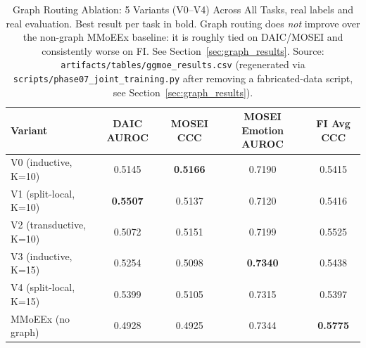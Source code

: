 \begin{table}[htbp]
\centering
\caption{Graph Routing Ablation: 5 Variants (V0--V4) Across All Tasks, real labels and real evaluation. Best result per task in bold. Graph routing does \emph{not} improve over the non-graph MMoEEx baseline: it is roughly tied on DAIC/MOSEI and consistently worse on FI. See Section~\ref{sec:graph_results}. Source: \texttt{artifacts/tables/ggmoe\_results.csv} (regenerated via \texttt{scripts/phase07\_joint\_training.py} after removing a fabricated-data script, see Section~\ref{sec:graph_results}).}
\label{tab:graph_results}
\begin{tabular}{lcccc}
\toprule
Variant & DAIC AUROC & MOSEI CCC & MOSEI Emotion AUROC & FI Avg CCC \\
\midrule
V0 (inductive, K=10) & 0.5145 & \textbf{0.5166} & 0.7190 & 0.5415 \\
V1 (split-local, K=10) & \textbf{0.5507} & 0.5137 & 0.7120 & 0.5416 \\
V2 (transductive, K=10) & 0.5072 & 0.5151 & 0.7199 & 0.5525 \\
V3 (inductive, K=15) & 0.5254 & 0.5098 & \textbf{0.7340} & 0.5438 \\
V4 (split-local, K=15) & 0.5399 & 0.5105 & 0.7315 & 0.5397 \\
\midrule
MMoEEx (no graph) & 0.4928 & 0.4925 & 0.7344 & \textbf{0.5775} \\
\bottomrule
\end{tabular}
\end{table}